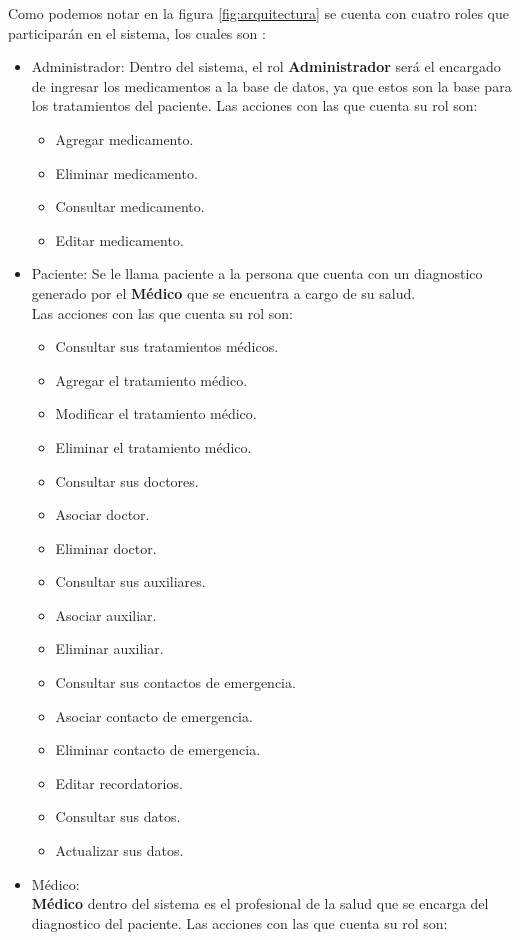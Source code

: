 Como podemos notar en la figura \ref{fig:arquitectura} se cuenta con cuatro roles que participarán en el sistema, los cuales son :
\begin{itemize}
	\item Administrador: Dentro del sistema, el rol \textbf{Administrador} será el encargado de ingresar los medicamentos a la base de datos, ya que estos son la base para los tratamientos del paciente.
	Las acciones con las que cuenta su rol son:
	\begin{itemize}
		\item Agregar medicamento.
		\item Eliminar medicamento.
		\item Consultar medicamento.
		\item Editar medicamento.
	\end{itemize}
	
	
	\item Paciente: Se le llama paciente a la persona que cuenta con un diagnostico generado por el \textbf{Médico} que se encuentra a cargo de su salud.\\
	
	Las acciones con las que cuenta su rol son:
	\begin{itemize}
		\item Consultar sus tratamientos médicos.
		\item Agregar el tratamiento médico.
		\item Modificar el tratamiento médico.
		\item Eliminar el tratamiento médico.
		\item Consultar sus doctores.
		\item Asociar doctor.
		\item Eliminar doctor.
		\item Consultar sus auxiliares.
		\item Asociar auxiliar.
		\item Eliminar auxiliar.
		\item Consultar sus contactos de emergencia.
		\item Asociar contacto de emergencia.
		\item Eliminar contacto de emergencia.
		\item Editar recordatorios.
		\item Consultar sus datos.
		\item Actualizar sus datos.
	\end{itemize}

	\item Médico: \\ \textbf{Médico} dentro del sistema es el profesional de la salud que se encarga del diagnostico del paciente.
	Las acciones con las que cuenta su rol son:
		\begin{itemize}
			

\end{itemize}
\end{itemize}
